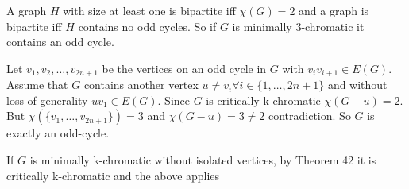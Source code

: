A graph $H$ with size at least one is bipartite iff $\chi(G) = 2$ 
and a graph is bipartite iff $H$ contains no odd cycles. 
So if $G$ is minimally 3-chromatic it contains an odd cycle.

Let $v_1, v_2, \ldots, v_{2n+1}$ be the vertices on an odd
cycle in $G$ with $v_iv_{i+1} \in E(G)$. Assume that $G$
contains another vertex $u \ne v_i \forall i \in \{1, \ldots, 2n+1\}$
and without loss of generality $uv_1 \in E(G)$. Since $G$ is
critically k-chromatic $\chi(G-u) = 2$. But $\chi(\{ v_1, \ldots, v_{2n+1} \}) = 3$
and $\chi(G-u) = 3 \ne 2$ contradiction. So $G$ is exactly an odd-cycle.

If $G$ is minimally k-chromatic without isolated vertices, by Theorem
42 it is critically k-chromatic and the above applies
